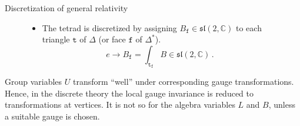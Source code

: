 \documentclass[12pt,titlepage]{article}
\begin{document}
\begin{frame}{Discretization of general relativity}
\begin{figure}[!ht]
\begin{minipage}{0.5\linewidth}
{\begin{itemize}
\begin{equation}
                    \omega\to U_\mathtt{e}=\operatorname{P} e^{\int_\mathtt{e} \omega}\in\mathbf{SL}(2,\mathbb{C})\,.
                \end{equation}
                \item<2-> The tetrad is discretized by assigning $B_\mathtt{f}\in\mathfrak{sl}(2,\mathbb{C})$ to each triangle $\mathtt{t}$ of $\Delta$ (or face $\mathtt{f}$ of $\Delta^\text{*}$).
                \begin{equation}
                    e\to B_\mathtt{f}=\int_\mathtt{t_f} B\in\mathfrak{sl}(2,\mathbb{C})\,.
                \end{equation}
            \end{itemize}}
        \end{minipage}
    \end{figure}\FloatBarrier
    \begin{list}{\,}{\leftmargin=1em \itemindent=0em}
        \item<3-> Group variables $U$ transform ``well'' under corresponding gauge transformations. Hence, in the discrete theory the local gauge invariance is reduced to transformations at vertices. It is not so for the algebra variables $L$ and $B$, unless a suitable gauge is chosen.
    \end{list}
\end{frame}
\end{document}
